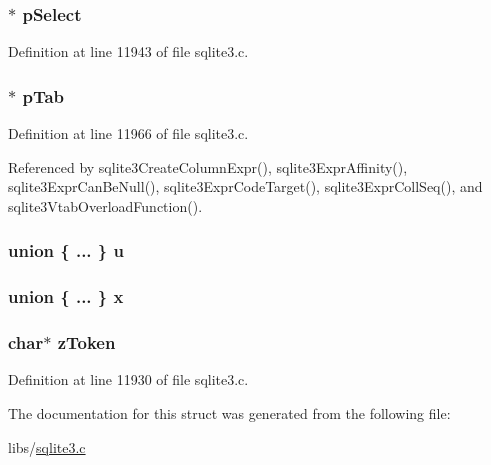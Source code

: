 \hypertarget{struct_expr_ab0e0ccc47de126415a7ad889ff1d228a}{}
\subsubsection[{p\+Select}]{$\ast$ p\+Select}\label{struct_expr_ab0e0ccc47de126415a7ad889ff1d228a}


Definition at line 11943 of file sqlite3.\+c.

\hypertarget{struct_expr_a11b1abc167f386db2ab7fc634c880c26}{}
\subsubsection[{p\+Tab}]{$\ast$ p\+Tab}\label{struct_expr_a11b1abc167f386db2ab7fc634c880c26}


Definition at line 11966 of file sqlite3.\+c.



Referenced by sqlite3\+Create\+Column\+Expr(), sqlite3\+Expr\+Affinity(), sqlite3\+Expr\+Can\+Be\+Null(), sqlite3\+Expr\+Code\+Target(), sqlite3\+Expr\+Coll\+Seq(), and sqlite3\+Vtab\+Overload\+Function().

\hypertarget{struct_expr_a513b253e2c7a4c81bbe4baa751ee3234}{}
\subsubsection[{u}]{\setlength{\rightskip}{0pt plus 5cm}union \{ ... \}   u}\label{struct_expr_a513b253e2c7a4c81bbe4baa751ee3234}
\hypertarget{struct_expr_a95457a56ef1d34bb75d4a453d46857b6}{}
\subsubsection[{x}]{\setlength{\rightskip}{0pt plus 5cm}union \{ ... \}   x}\label{struct_expr_a95457a56ef1d34bb75d4a453d46857b6}
\hypertarget{struct_expr_a5a93ea536dadeb6f29a3542041ba5bf3}{}
\subsubsection[{z\+Token}]{\setlength{\rightskip}{0pt plus 5cm}char$\ast$ z\+Token}\label{struct_expr_a5a93ea536dadeb6f29a3542041ba5bf3}


Definition at line 11930 of file sqlite3.\+c.



The documentation for this struct was generated from the following file\+:\begin{DoxyCompactItemize}
\item 
libs/\hyperlink{sqlite3_8c}{sqlite3.\+c}\end{DoxyCompactItemize}
